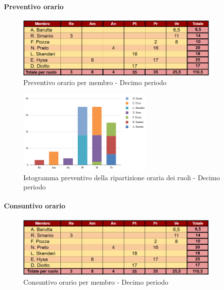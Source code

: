 \paragraph{Preventivo orario}

\begin{figure}[H] 
    \centering
    \includegraphics[width=0.9\textwidth]{../Images/preventivoOrario10Periodo.png}
    \caption{Preventivo orario per membro - Decimo periodo}
    \label{fig:Preventivo_orario_10}
\end{figure}

\begin{figure}[H]
    \centering
    \includegraphics[width=0.6\textwidth]{../Images/preventivoDivisioneRuoli10Periodo.png}
    \caption{Istogramma preventivo della ripartizione oraria dei ruoli - Decimo periodo}
    \label{fig:Preventivo_ripartizione_oraria_10}
\end{figure}

\paragraph{Consuntivo orario}

\begin{figure}[H]
    \centering
    \includegraphics[width=0.9\textwidth]{../Images/consuntivoOrario10Periodo.png}
    \caption{Consuntivo orario per membro - Decimo periodo}
    \label{fig:Constuntivo_orario_10}
\end{figure}


